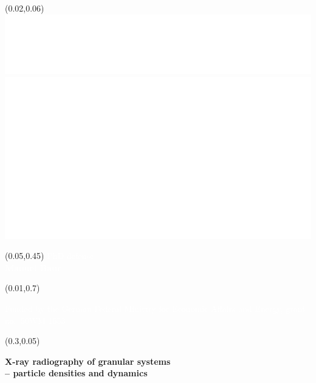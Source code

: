 \begin{frame}


\begin{textblock}{0.22}(0.02,0.06)
	\includegraphics[width=\textwidth]{Sources/title/Logo_FAU_DinA4_RGB_Negativ.png}
	\includegraphics[width=\textwidth]{Sources/title/mss_negative.png}
	\vspace{1.5cm}
\end{textblock}
\begin{textblock}{0.25}(0.05,0.45)
	\textcolor{white}{
	{\large PhD defense \\
		\textbf{Manuel Baur}}}
\end{textblock}

\begin{textblock}{0.23}(0.01,0.7)
	\centering
	\begin{spacing}{.9}
		\textcolor{white}{
		\footnotesize{
			{
			Funded by the German Federal Ministry for Economic Affairs and Energy,
			grant no.\ 50WM 1653}
			}
		}
	\end{spacing}
\end{textblock}



\begin{textblock}{0.65}(0.3,0.05)
	\begin{center}
		\textcolor{blue1}{							
		\Large{\textbf{
			X-ray radiography of granular systems\\
			-- particle densities and dynamics}}
		}
	\end{center}
\end{textblock}



\end{frame}
